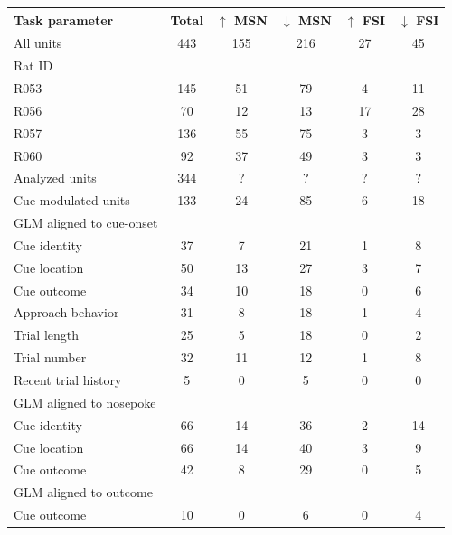 \documentclass[11pt]{article}
\begin{document}
\begin{table}[p]
\centering
\setlength{\tabcolsep}{1 em} %
\begin{tabular}{l c  c c c c}

Task parameter                                 & Total        & $\uparrow$ MSN        & $\downarrow$ MSN        & $\uparrow$ FSI       & $\downarrow$ FSI\\
\hline
All units                       & 443        & 155         & 216          & 27          & 45\\
\hline
Rat ID                       &         &       &          &          &\\
\hline
R053                       & 145         & 51          & 79          & 4         & 11\\
\hline
R056                       & 70         & 12          & 13         & 17          & 28\\
\hline
R057   	          & 136         & 55          & 75          & 3          & 3\\
\hline
R060                       & 92         & 37          & 49          & 3          & 3\\
\hline 
Analyzed units                       & 344        & ?         & ?         & ?          & ?\\
\hline
Cue modulated units                      & 133         &24          &85          & 6          &18\\
\hline
GLM aligned to cue-onset                       &         &       &          &          &\\
\hline
Cue identity       & 37         & 7          & 21          & 1          & 8\\
\hline
Cue location       & 50         &13          & 27          & 3          & 7\\
\hline
Cue outcome       & 34         & 10          & 18        & 0          & 6\\
\hline
Approach behavior      & 31         & 8          & 18          & 1          & 4\\
\hline
Trial length       & 25        & 5          & 18         & 0         & 2\\
\hline
Trial number       & 32         & 11          & 12         & 1          & 8\\
\hline
Recent trial history       & 5         & 0          &5          & 0          & 0\\
\hline
GLM aligned to nosepoke                       &         &       &          &          &\\
\hline
Cue identity       & 66         &14          & 36          & 2          &14\\
\hline
Cue location       & 66         &14          & 40          & 3          & 9\\
\hline
Cue outcome       & 42        & 8          & 29        & 0          & 5\\
\hline
GLM aligned to outcome                       &         &       &          &          &\\
\hline
Cue outcome       & 10        & 0          & 6       & 0          &4\\
\hline


\end{tabular}
\end{table}
\end{document}

